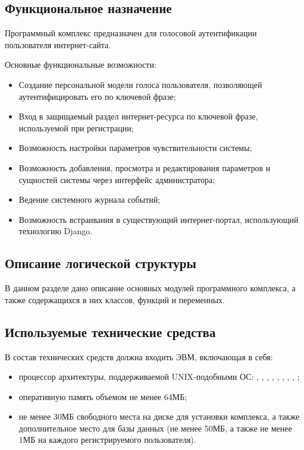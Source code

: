 \subsection{Функциональное назначение}

Программный комплекс предназначен для голосовой аутентификации пользователя
интернет-сайта.

Основные функциональные возможности:
\begin{itemize}
\item Создание персональной модели голоса пользователя, позволяющей
аутентифицировать его по ключевой фразе;
\item Вход в защищаемый раздел интернет-ресурса по ключевой фразе, используемой
при регистрации;
\item Возможность настройки параметров чувствительности системы;
\item Возможность добавления, просмотра и редактирования параметров и сущностей
системы через интерфейс администратора;
\item Ведение системного журнала событий;
\item Возможность встраивания в существующий интернет-портал, использующий
технологию Django.
\end{itemize}

\subsection{Описание логической структуры}

В данном разделе дано описание основных модулей программного комплекса, а также содержащихся в них классов, функций и переменных.



\subsection{Используемые технические средства}
\label{sec:soft_description:tech}

В состав технических средств должна входить ЭВМ, включающая в себя:
\begin{itemize}
    \item процессор архитектуры, поддерживаемой UNIX-подобными ОС: , , , , , , , , ;
    \item оперативную память объемом не менее 64МБ;
    \item не менее 30МБ свободного места на диске для установки комплекса, а также дополнительное место для базы данных (не менее 50МБ, а также не менее 1МБ на каждого регистрируемого пользователя).
\end{itemize}

